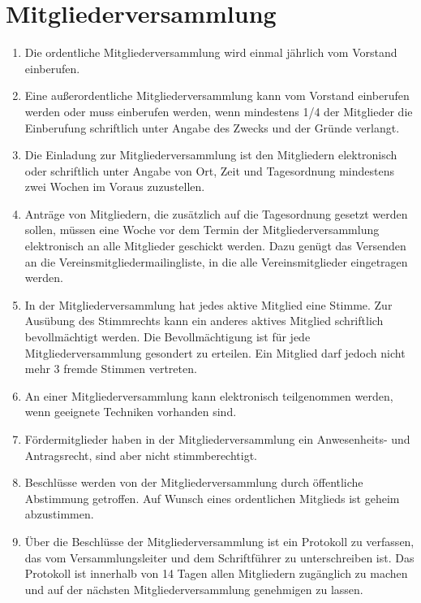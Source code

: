 \documentclass[ngerman]{article}
\begin{document}
\section{Mitgliederversammlung}

\begin{enumerate}
  \item Die ordentliche Mitgliederversammlung wird einmal jährlich vom Vorstand einberufen.
  \item Eine außerordentliche Mitgliederversammlung kann vom Vorstand einberufen werden oder muss  einberufen werden, wenn mindestens 1/4 der Mitglieder die Einberufung schriftlich unter Angabe des Zwecks und der Gründe verlangt.
  \item Die Einladung zur Mitgliederversammlung ist den Mitgliedern elektronisch oder schriftlich unter Angabe von Ort, Zeit und Tagesordnung mindestens zwei Wochen im Voraus zuzustellen.
  \item Anträge von Mitgliedern, die zusätzlich auf die Tagesordnung gesetzt werden sollen, müssen eine Woche vor dem Termin der Mitgliederversammlung elektronisch an alle Mitglieder geschickt werden. Dazu genügt das Versenden an die Vereinsmitgliedermailingliste, in die alle Vereinsmitglieder eingetragen werden.
  \item In der Mitgliederversammlung hat jedes aktive Mitglied eine Stimme. Zur Ausübung des Stimmrechts kann ein anderes aktives Mitglied schriftlich bevollmächtigt werden. Die Bevollmächtigung ist für jede Mitgliederversammlung gesondert zu erteilen. Ein Mitglied darf jedoch nicht mehr 3 fremde Stimmen vertreten.
  \item An einer Mitgliederversammlung kann elektronisch teilgenommen werden, wenn geeignete Techniken vorhanden sind.
  \item Fördermitglieder haben in der Mitgliederversammlung ein Anwesenheits- und Antragsrecht, sind aber nicht stimmberechtigt.
  \item Beschlüsse werden von der Mitgliederversammlung durch öffentliche Abstimmung getroffen.
  Auf Wunsch eines ordentlichen Mitglieds ist geheim abzustimmen.
  \item Über die Beschlüsse der Mitgliederversammlung ist ein Protokoll zu verfassen, das vom
Versammlungsleiter und dem Schriftführer zu unterschreiben ist.
Das Protokoll ist innerhalb von 14 Tagen allen Mitgliedern zugänglich zu machen und auf der nächsten Mitgliederversammlung genehmigen zu lassen.
\end{enumerate}
\end{document}

